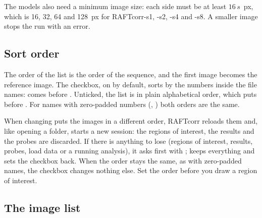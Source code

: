 The models also need a minimum image size: each side must be at least $16\,s$~px, which is
16, 32, 64 and 128~px for RAFTcorr-s1, -s2, -s4 and -s8. A smaller image stops the run with an
error.

\subsection{Sort order}

The order of the list is the order of the sequence, and the first image becomes the reference
image. The  checkbox, on by default, sorts by the numbers inside
the file names:  comes before . Unticked, the list is in plain
alphabetical order, which puts  before . For names with
zero-padded numbers (, ) both orders are the same.

\begin{warnbox}
When changing  puts the images in a different order, RAFTcorr reloads them and,
like opening a folder, starts a new session: the regions of interest, the results and the probes
are discarded. If there is anything to lose (regions of interest, results, probes, load data or
a running analysis), it asks first with ;  keeps everything
and sets the checkbox back. When the order stays the same, as with zero-padded names, the
checkbox changes nothing else. Set the order before you draw a region of interest.
\end{warnbox}

\subsection{The image list}


